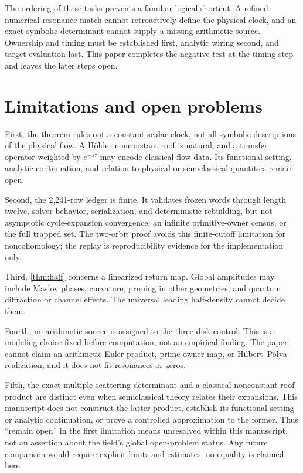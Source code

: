 \documentclass[11pt,a4paper]{article}
\theoremstyle{definition}
\theoremstyle{remark}
\begin{document}
The ordering of these tasks prevents a familiar logical shortcut. A refined numerical resonance match cannot retroactively define the physical clock, and an exact symbolic determinant cannot supply a missing arithmetic source. Ownership and timing must be established first, analytic wiring second, and target evaluation last. This paper completes the negative test at the timing step and leaves the later steps open.

\section{Limitations and open problems}

First, the theorem rules out a constant scalar clock, not all symbolic descriptions of the physical flow. A Hölder nonconstant roof is natural, and a transfer operator weighted by \(e^{-s\tau}\) may encode classical flow data. Its functional setting, analytic continuation, and relation to physical or semiclassical quantities remain open.

Second, the 2,241-row ledger is finite. It validates frozen words through length twelve, solver behavior, serialization, and deterministic rebuilding, but not asymptotic cycle-expansion convergence, an infinite primitive-owner census, or the full trapped set. The two-orbit proof avoids this finite-cutoff limitation for noncohomology; the replay is reproducibility evidence for the implementation only.

Third, \cref{thm:half} concerns a linearized return map. Global amplitudes may include Maslov phases, curvature, pruning in other geometries, and quantum diffraction or channel effects. The universal leading half-density cannot decide them.

Fourth, no arithmetic source is assigned to the three-disk control. This is a modeling choice fixed before computation, not an empirical finding. The paper cannot claim an arithmetic Euler product, prime-owner map, or Hilbert--Pólya realization, and it does not fit resonances or zeros.

Fifth, the exact multiple-scattering determinant and a classical nonconstant-roof product are distinct even when semiclassical theory relates their expansions. This manuscript does not construct the latter product, establish its functional setting or analytic continuation, or prove a controlled approximation to the former. Thus ``remain open'' in the first limitation means unresolved within this manuscript, not an assertion about the field's global open-problem status. Any future comparison would require explicit limits and estimates; no equality is claimed here.
\end{document}
